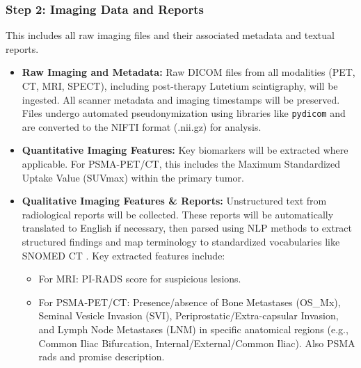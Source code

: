 \documentclass[11pt, a4paper]{article}
\begin{document}
\subsubsection{Step 2: Imaging Data and Reports}
This includes all raw imaging files and their associated metadata and textual reports.
\begin{itemize}
    \item \textbf{Raw Imaging and Metadata:} Raw DICOM files from all modalities (PET, CT, MRI, SPECT), including post-therapy Lutetium scintigraphy, will be ingested. All scanner metadata and imaging timestamps will be preserved. Files undergo automated pseudonymization using libraries like \texttt{pydicom} \cite{JunqueroMartinezGirones2024, KondylakisKalokyri2023} and are converted to the NIFTI format (.nii.gz) for analysis.
    \item \textbf{Quantitative Imaging Features:} Key biomarkers will be extracted where applicable. For PSMA-PET/CT, this includes the Maximum Standardized Uptake Value (SUVmax) within the primary tumor.
    \item \textbf{Qualitative Imaging Features \& Reports:} Unstructured text from radiological reports will be collected. These reports will be automatically translated to English if necessary, then parsed using NLP methods to extract structured findings and map terminology to standardized vocabularies like SNOMED CT \cite{PesapaneTantrige2023}. Key extracted features include:
    \begin{itemize}
        \item For MRI: PI-RADS score for suspicious lesions.
        \item For PSMA-PET/CT: Presence/absence of Bone Metastases (OS\_Mx), Seminal Vesicle Invasion (SVI), Periprostatic/Extra-capsular Invasion, and Lymph Node Metastases (LNM) in specific anatomical regions (e.g., Common Iliac Bifurcation, Internal/External/Common Iliac). Also PSMA rads and promise description. 
    \end{itemize}
\end{itemize}
\end{document}
